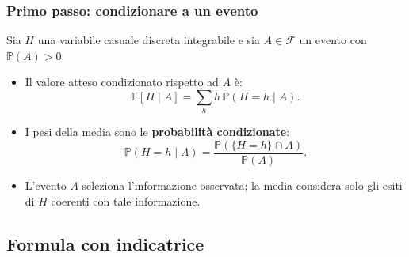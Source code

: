 \documentclass[handout]{beamer}%
\newenvironment{stepitemize}{\begin{itemize}[<+->]}{\end{itemize} }
\providecommand{\E}{\mathbb{E}}
\providecommand{\Prob}{\mathbb{P}}
\providecommand{\F}{\mathcal{F}}
\providecommand{\1}{\mathbf{1}}
\providecommand{\QTR}[2]{\csname #1\endcsname{#2}}
\begin{document}
\begin{frame}%
%

\frametitle{Primo passo: condizionare a un evento}%
%

%


Sia $H$ una variabile casuale discreta integrabile e sia $A\in\F$ un evento
con $\Prob(A)>0$.

\medskip

\begin{stepitemize}
\item Il valore atteso condizionato rispetto ad $A$ \`{e}:
\[
\E[H\mid A]=\sum_{h} h\,\Prob(H=h\mid A).
\]


\item I pesi della media sono le \textbf{probabilit\`{a} condizionate}:
\[
\Prob(H=h\mid A) = \frac{\Prob(\{H=h\}\cap A)}{\Prob(A)}.
\]


\item L'evento $A$ seleziona l'informazione osservata; la media considera solo
gli esiti di $H$ coerenti con tale informazione.
\end{stepitemize}%

\transboxout
\end{frame}%


\subsection{Formula con indicatrice}%
\end{document}
